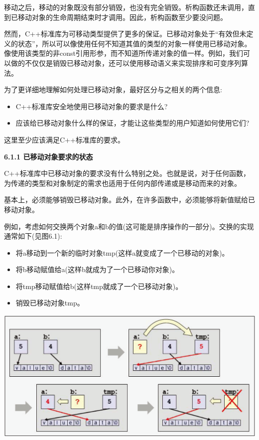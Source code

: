 移动之后，移动的对象既没有部分销毁，也没有完全销毁。析构函数还未调用，直到已移动对象的生命周期结束时才调用。因此，析构函数至少要没问题。\par

然而，C++标准库为可移动类型提供了更多的保证。已移动对象处于“有效但未定义的状态”，所以可以像使用任何不知道其值的类型的对象一样使用已移动对象。像使用该类型的非const引用形参，而不知道所传递对象的值一样。例如，我们可以做的不仅仅是销毁已移动对象，还可以使用移动语义来实现排序和可变序列算法。\par

为了更详细地理解如何处理已移动对象，最好区分与之相关的两个信息:\par

\begin{itemize}
	\item C++标准库安全地使用已移动对象的要求是什么?
	\item 应该给已移动对象什么样的保证，才能让这些类型的用户知道如何使用它们?
\end{itemize}

这里至少应该满足C++标准库的要求。\par

\hspace*{\fill} \par %
\textbf{6.1.1 已移动对象要求的状态}

C++标准库中已移动对象的要求没有什么特别之处。也就是说，对于任何函数，为传递的类型和对象制定的需求也适用于任何内部传递或是移动而来的对象。\par

基本上，必须能够销毁已移动对象。此外，在许多函数中，必须能够将新值赋给已移动对象。\par

例如，考虑如何交换两个对象a和b的值(这可能是排序操作的一部分)。交换的实现通常如下(见图6.1):\par

\begin{itemize}
	\item 将a移动到一个新的临时对象tmp(这样a就变成了一个已移动的对象)。
	\item 将b移动赋值给a(这样b就成为了一个已移动你对象)。
	\item 将tmp移动赋值给b(这样tmp就成了一个已移动对象)。
	\item 销毁已移动对象tmp。
\end{itemize}

\begin{center}
	\includegraphics[width=1.0\textwidth]{content/1/chapter6/images/1}
\end{center}

